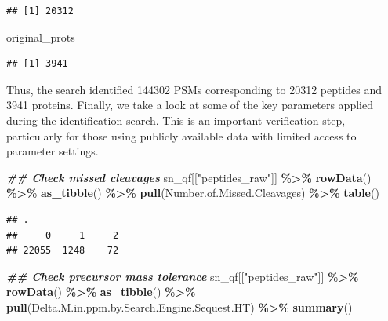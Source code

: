 \documentclass[9pt,a4paper,]{extarticle}
\newenvironment{Shaded}{\begin{snugshade}}{\end{snugshade}}
\newcommand{\DocumentationTok}[1]{\textcolor[rgb]{0.56,0.35,0.01}{\textbf{\textit{#1}}}}
\newcommand{\FunctionTok}[1]{\textcolor[rgb]{0.13,0.29,0.53}{\textbf{#1}}}
\newcommand{\NormalTok}[1]{#1}
\newcommand{\SpecialCharTok}[1]{\textcolor[rgb]{0.81,0.36,0.00}{\textbf{#1}}}
\newcommand{\StringTok}[1]{\textcolor[rgb]{0.31,0.60,0.02}{#1}}
\begin{document}
\begin{verbatim}
## [1] 20312
\end{verbatim}

\begin{Shaded}
\begin{Highlighting}[]
\NormalTok{original\_prots}
\end{Highlighting}
\end{Shaded}

\begin{verbatim}
## [1] 3941
\end{verbatim}

Thus, the search identified 144302 PSMs
corresponding to 20312 peptides and
3941 proteins. Finally, we take a look at some of the key
parameters applied during the identification search. This is an important
verification step, particularly for those using publicly available data with
limited access to parameter settings.

\begin{Shaded}
\begin{Highlighting}[]
\DocumentationTok{\#\# Check missed cleavages}
\NormalTok{sn\_qf[[}\StringTok{"peptides\_raw"}\NormalTok{]] }\SpecialCharTok{\%\textgreater{}\%}
  \FunctionTok{rowData}\NormalTok{() }\SpecialCharTok{\%\textgreater{}\%} 
  \FunctionTok{as\_tibble}\NormalTok{() }\SpecialCharTok{\%\textgreater{}\%} 
  \FunctionTok{pull}\NormalTok{(Number.of.Missed.Cleavages) }\SpecialCharTok{\%\textgreater{}\%} 
  \FunctionTok{table}\NormalTok{()}
\end{Highlighting}
\end{Shaded}

\begin{verbatim}
## .
##     0     1     2 
## 22055  1248    72
\end{verbatim}

\begin{Shaded}
\begin{Highlighting}[]
\DocumentationTok{\#\# Check precursor mass tolerance}
\NormalTok{sn\_qf[[}\StringTok{"peptides\_raw"}\NormalTok{]] }\SpecialCharTok{\%\textgreater{}\%}
  \FunctionTok{rowData}\NormalTok{() }\SpecialCharTok{\%\textgreater{}\%} 
  \FunctionTok{as\_tibble}\NormalTok{() }\SpecialCharTok{\%\textgreater{}\%} 
  \FunctionTok{pull}\NormalTok{(Delta.M.in.ppm.by.Search.Engine.Sequest.HT) }\SpecialCharTok{\%\textgreater{}\%} 
  \FunctionTok{summary}\NormalTok{()}
\end{Highlighting}
\end{Shaded}
\end{document}
